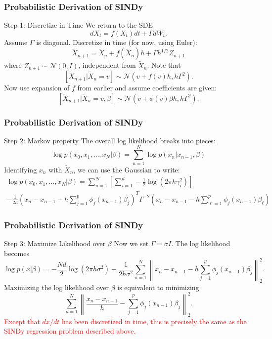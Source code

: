 \documentclass{beamer}
\begin{document}
\begin{frame}
\frametitle{Probabilistic Derivation of SINDy}
\begin{block}{Step 1: Discretize in Time}
We return to the SDE
$$
d X_t = f(X_t) dt + \Gamma dW_t.
$$
Assume $\Gamma$ is diagonal.  Discretize in time (for now, using Euler):
$$
\widetilde{X}_{n+1} = \widetilde{X}_n + f(\widetilde{X}_n) h + \Gamma h^{1/2} Z_{n+1}
$$
where $Z_{n+1} \sim \mathcal{N}(0, I)$, independent from $\widetilde{X}_n$.  Note that
$$
[\widetilde{X}_{n+1} | \widetilde{X}_n = v] \sim \mathcal{N}(v + f(v) h, h \Gamma^2).
$$
Now use expansion of $f$ from earlier and assume coefficients are given:
$$
[\widetilde{X}_{n+1} | \widetilde{X}_n = v, \beta] \sim \mathcal{N}(v + \phi(v) \beta h, h \Gamma^2).
$$
\end{block}
\end{frame}

\begin{frame}
\frametitle{Probabilistic Derivation of SINDy}
\begin{block}{Step 2: Markov property}
The overall log likelihood breaks into pieces:
$$
\log p(x_0, x_1, \ldots, x_N | \beta) = \sum_{n=1}^N \log p(x_n | x_{n-1}, \beta)
$$
Identifying $x_n$ with $\widetilde{X}_n$, we can use the Gaussian to write:
\begin{multline*}
\log p(x_0, x_1, \ldots, x_N | \beta) = \sum_{n=1}^N \left[ \sum_{i=1}^d -\frac{1}{2} \log(2 \pi h \gamma_i^2) \right] \\
- \frac{1}{2h} (x_n - x_{n-1} - h \sum_{j=1}^p \phi_j(x_{n-1}) \beta_j)^T \Gamma^{-2} (x_n - x_{n-1} - h \sum_{\ell=1}^p \phi_j(x_{n-1}) \beta_\ell)
\end{multline*}
\end{block}
\end{frame}

\begin{frame}
\frametitle{Probabilistic Derivation of SINDy}
\begin{block}{Step 3: Maximize Likelihood over $\beta$}
Now we set $\Gamma = \sigma I$.  The log likelihood becomes
$$
\log p(x | \beta) = -\frac{N d}{2} \log(2 \pi h \sigma^2) - \frac{1}{2 h \sigma^2} \sum_{n=1}^N \left\| x_n - x_{n-1} - h \sum_{j=1}^p \phi_j(x_{n-1}) \beta_j \right\|_2^2.
$$
Maximizing the log likelihood over $\beta$ is equivalent to minimizing
$$
\sum_{n=1}^N \left\| \frac{x_n - x_{n-1}}{h} - \sum_{j=1}^p \phi_j(x_{n-1}) \beta_j \right\|_2^2.
$$
\textcolor{red}{Except that $dx/dt$ has been discretized in time, this is precisely the same as the SINDy regression problem described above.}
\end{block}
\end{frame}
\end{document}
